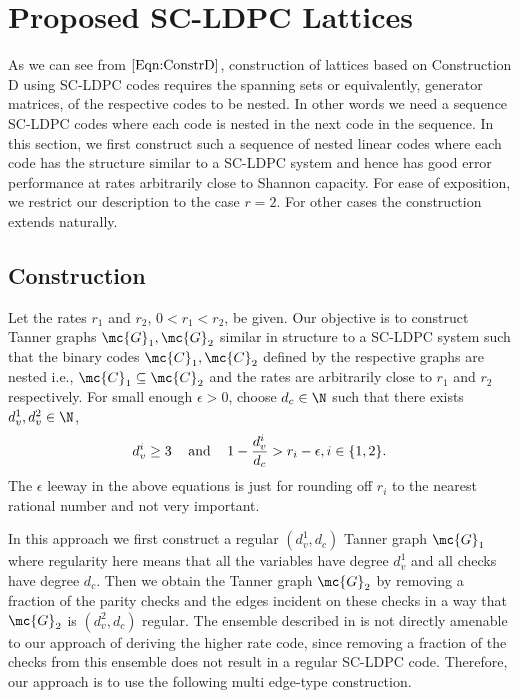 \documentclass[journal]{IEEEtran}
\begin{document}
\section{Proposed SC-LDPC Lattices}\label{Sec:SCLDPC}
As we can see from $\eqref{Eqn:ConstrD}$, construction of lattices based on Construction D using SC-LDPC codes requires the spanning sets or equivalently, generator matrices, of the respective codes to be nested. In other words we need a sequence SC-LDPC codes where each code is nested in the next code in the sequence. In this section, we first construct such a sequence of nested linear codes where each code has the structure similar to a SC-LDPC system and hence has good error performance at rates arbitrarily close to Shannon capacity. For ease of exposition, we restrict our description to the case $r=2$. For other cases the construction extends naturally.

\subsection{Construction}
Let the rates $r_{1}$ and $r_{2}$, $0< r_{1}<r_{2}$, be given. Our objective is to construct Tanner graphs $\mc{G}_{1},\mc{G}_{2}$ similar in structure to a SC-LDPC system such that the binary codes $\mc{C}_{1},\mc{C}_{2}$ defined by the respective graphs are nested i.e., $\mc{C}_{1}\subseteq \mc{C}_{2}$ and the rates are arbitrarily close to $r_{1}$ and $r_{2}$ respectively.
For small enough $\epsilon >0$, choose $d_{c}\in\N$ such that there exists $d_{v}^{1},d_{v}^{2}\in \N$,
\begin{align}
	d_{v}^{i}\geq 3 \hspace{0.3cm} \text{  and }  \hspace{0.3cm}  1-\frac{d_{v}^{i}}{d_{c}}>r_{i}-\epsilon, i\in \{1,2\}.
						\label{Eqn:DegreeConditions1}
\end{align}
The $\epsilon$ leeway in the above equations is just for rounding off $r_{i}$ to the nearest rational number and not very important.

In this approach we first construct a regular $(d_{v}^{1},d_{c})$ Tanner graph $\mc{G}_{1}$ where regularity here means that all the variables have degree $d_{v}^{1}$ and all checks have degree $d_{c}$. Then we obtain the Tanner graph $\mc{G}_{2}$ by removing a fraction of the parity checks and the edges incident on these checks in a way that $\mc{G}_{2}$ is $(d_{v}^{2},d_{c})$ regular. The ensemble described in\cite{KudekarUrbanke11} is not directly amenable to our approach of deriving the higher rate code, since removing a fraction of the checks from this ensemble does not result in a regular SC-LDPC code. Therefore, our approach is to use the following multi edge-type construction.
\end{document}
